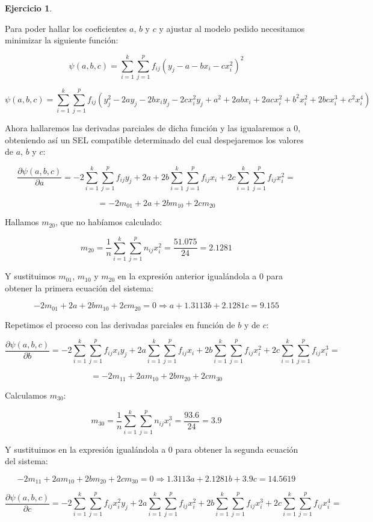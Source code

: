 \documentclass[a4paper, 12pt]{article}
\theoremstyle{definition}
\newtheorem{ej}{Ejercicio}
\begin{document}
\begin{ej}
\begin{enumerate}[label=\alph*)]
Para poder hallar los coeficientes $a$, $b$ y $c$ y ajustar al modelo pedido necesitamos minimizar la siguiente función:

\[
    \psi(a,b,c) = \sum_{i=1}^{k}\sum_{j=1}^{p}f_{ij}(y_j-a-bx_i-cx_{i}^{2})^2
\]

\[
    \psi(a,b,c) = \sum_{i=1}^{k}\sum_{j=1}^{p}f_{ij}(y_{j}^2-2ay_j-2bx_i y_j -2cx_{i}^{2}y_j+a^2+2abx_i+2acx_{i}^{2}+b^2 x_{i}^{2}+2bcx_{i}^{3}+c^2 x_{i}^{4})
\]

Ahora hallaremos las derivadas parciales de dicha función y las igualaremos a 0, obteniendo así un SEL compatible determinado del cual despejaremos los valores de $a$, $b$ y $c$:

\[
    \frac{\partial\psi(a,b,c)}{\partial a} = -2\sum_{i=1}^{k}\sum_{j=1}^{p}f_{ij}y_j + 2a + 2b\sum_{i=1}^{k}\sum_{j=1}^{p}f_{ij}x_i + 2c\sum_{i=1}^{k}\sum_{j=1}^{p}f_{ij}x_{i}^{2} = 
\]

\[
    = -2m_{01}+2a+2bm_{10}+2cm_{20}
\]

Hallamos $m_{20}$, que no habíamos calculado:

\[
    m_{20} = \frac{1}{n}\sum_{i=1}^{k}\sum_{j=1}^{p}n_{ij}x_{i}^{2} = \frac{51.075}{24} = 2.1281
\]

Y sustituimos $m_{01}$, $m_{10}$ y $m_{20}$ en la expresión anterior igualándola a 0 para obtener la primera ecuación del sistema:

\[
    -2m_{01}+2a+2bm_{10}+2cm_{20} = 0 \Rightarrow a+1.3113b+2.1281c=9.155
\]

Repetimos el proceso con las derivadas parciales en función de $b$ y de $c$:

\[
    \frac{\partial\psi(a,b,c)}{\partial b} = -2\sum_{i=1}^{k}\sum_{j=1}^{p}f_{ij}x_i y_j + 2a\sum_{i=1}^{k}\sum_{j=1}^{p}f_{ij}x_i + 2b\sum_{i=1}^{k}\sum_{j=1}^{p}f_{ij}x_{i}^{2}+ 2c\sum_{i=1}^{k}\sum_{j=1}^{p}f_{ij}x_{i}^{3} = 
\]

\[
    = -2m_{11}+2am_{10}+2bm_{20}+2cm_{30}
\]

Calculamos $m_{30}$:

\[
    m_{30} = \frac{1}{n}\sum_{i=1}^{k}\sum_{j=1}^{p}n_{ij}x_{i}^{3} = \frac{93.6}{24} = 3.9
\]

Y sustituimos en la expresión igualándola a 0 para obtener la segunda ecuación del sistema:

\[
    -2m_{11}+2am_{10}+2bm_{20}+2cm_{30} = 0 \Rightarrow 1.3113a+2.1281b+3.9c=14.5619
\]

\[
    \frac{\partial\psi(a,b,c)}{\partial c} = -2\sum_{i=1}^{k}\sum_{j=1}^{p}f_{ij}x_{i}^{2} y_j + 2a\sum_{i=1}^{k}\sum_{j=1}^{p}f_{ij}x_{i}^{2} + 2b\sum_{i=1}^{k}\sum_{j=1}^{p}f_{ij}x_{i}^{3}+ 2c\sum_{i=1}^{k}\sum_{j=1}^{p}f_{ij}x_{i}^{4} = 
\]


\end{enumerate}
\end{ej}
\end{document}

